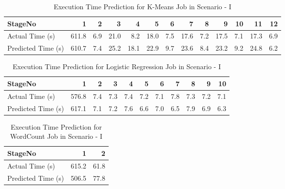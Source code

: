 \begin{table}[!htb]
\renewcommand{\arraystretch}{1.3}
\caption{Execution Time Prediction for K-Means Job in Scenario - I}
\label{bkm}
\centering
\begin{tabular}{l|r|r|r|r|r|r|r|r|r|r|r|r}
\hline
\bfseries StageNo & \bfseries 1 & \bfseries 2 & \bfseries 3 & \bfseries 4 & \bfseries 5 & \bfseries 6 & \bfseries 7 & \bfseries 8 & \bfseries 9 & \bfseries 10 & \bfseries 11 & \bfseries 12\\
\hline \hline
Actual Time (s)
&611.8
&6.9
&21.0
&8.2
&18.0
&7.5
&17.6
&7.2
&17.5
&7.1
&17.3
&6.9 \\
\hline
Predicted Time (s) 
&610.7
&7.4
&25.2
&18.1
&22.9
&9.7
&23.6
&8.4
&23.2
&9.2
&24.8
&6.2 \\
\hline
\end{tabular}
\end{table}

\begin{table}[!htb]
\renewcommand{\arraystretch}{1.3}
\caption{Execution Time Prediction for Logistic Regression Job in Scenario - I}
\label{blr}
\centering
\begin{tabular}{l|r|r|r|r|r|r|r|r|r|r}
\hline
\bfseries StageNo & \bfseries 1 & \bfseries 2 & \bfseries 3 & \bfseries 4 & \bfseries 5 & \bfseries 6 & \bfseries 7 & \bfseries 8 & \bfseries 9 & \bfseries 10 \\
\hline \hline
Actual Time (s)
&576.8
&7.4
&7.3
&7.4
&7.2
&7.1
&7.8
&7.3
&7.2
&7.1 \\
\hline
Predicted Time (s) 
&617.1
&7.1
&7.2
&7.6
&6.6
&7.0
&6.5
&7.9
&6.9
&6.3
\\
\hline
\end{tabular}
\end{table}


\begin{table}[!htb]
\renewcommand{\arraystretch}{1.3}
\caption{Execution Time Prediction for WordCount Job in Scenario - I}
\label{bwc}
\centering
\begin{tabular}{l|r|r}
\hline
\bfseries StageNo & \bfseries 1 & \bfseries 2 \\
\hline \hline
Actual Time (s)
& 615.2
& 61.8 \\
\hline
Predicted Time (s) 
& 506.5
& 77.8 \\
\hline
\end{tabular}
\end{table}


